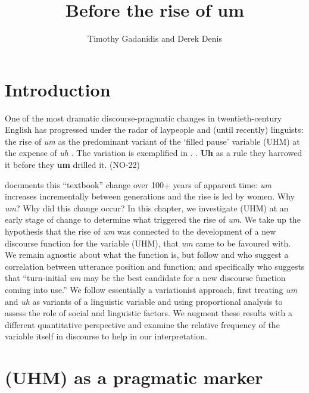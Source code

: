 \documentclass[11pt]{article}
\title{Before the rise of um}
\author{Timothy Gadanidis and Derek Denis}
\begin{document}
\maketitle

\section{Introduction}

One of the most dramatic discourse-pragmatic changes in twentieth-century
English has progressed under the radar of laypeople and (until recently)
linguists: the rise of \emph{um} as the predominant variant of the `filled
pause' variable (UHM) at the expense of \emph{uh} \parencite{tottie2011,
fruehwald2016, wielingetal2016}.
The variation is exemplified in \Next.
\ex. \textbf{Uh} as a rule they harrowed it before they \textbf{um} drilled it.
\hfill (NO-22)

\textcite[43]{fruehwald2016} documents this ``textbook'' change over 100+ years
of apparent time:
\emph{um} increases incrementally between generations and the rise is led by
women.
Why \emph{um}? Why did this change occur?
In this chapter, we investigate (UHM) at an early stage of change to determine
what triggered the rise of \emph{um}.
We take up the hypothesis that the rise of \emph{um} was connected to the
development of a new discourse function for the variable (UHM), that \emph{um}
came to be favoured with.
We remain agnostic about what the function is, but follow \textcite{tottie2016}
and \textcite{fruehwald2016} who suggest a correlation between utterance
position and function; and specifically \textcite[46]{fruehwald2016} who suggests
that ``turn-initial \emph{um} may be the best candidate for a new
discourse function coming into use.''
We follow essentially a variationist approach, first treating \emph{um} and
\emph{uh} as variants of a linguistic variable and using proportional analysis
to assess the role of social and linguistic factors.
We augment these results with a different quantitative perspective and examine
the relative frequency of the variable itself in discourse to help in our
interpretation.

\section{(UHM) as a pragmatic marker}
\end{document}
